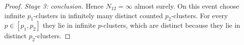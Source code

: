 \begin{proof}
\emph{Stage 3: conclusion.} Hence $N_{12}=\infty$ almost surely. On this event choose infinite
$p_1$-clusters in infinitely many distinct counted $p_2$-clusters. For every $p\in[p_1,p_2]$ they lie in
infinite $p$-clusters, which are distinct because they lie in distinct $p_2$-clusters.
\end{proof}
